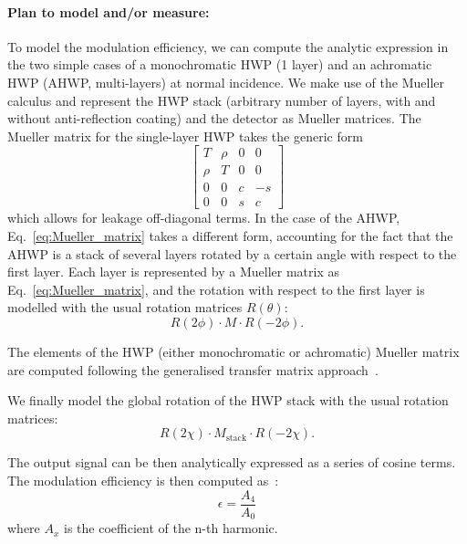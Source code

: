 \paragraph{Plan to model and/or measure:}
To model the modulation efficiency, we can compute the analytic expression in the two simple cases of a monochromatic HWP (1 layer) and an achromatic HWP (AHWP, multi-layers) at normal incidence. We make use of the Mueller calculus and represent the HWP stack (arbitrary number of layers, with and without anti-reflection coating) and the detector as Mueller matrices. The Mueller matrix for the single-layer HWP takes the generic form 
\begin{equation} 
\begin{bmatrix}
   T  &\rho  &0  &0\\
   \rho  &T  &0  &0\\
   0  &0  &c  &-s\\
   0  &0  &s  &c
\end{bmatrix}
\end{equation}\label{eq:Mueller_Matrix}
which allows for leakage off-diagonal terms. In the case of the AHWP, Eq.~\ref{eq:Mueller_matrix} takes a different form, accounting for the fact that the AHWP is a stack of several layers rotated by a certain angle with respect to the first layer. Each layer is represented by a Mueller matrix as Eq.~\ref{eq:Mueller_matrix}, and the rotation with respect to the first layer is modelled with the usual rotation matrices $R(\theta)$:
\begin{equation}
R{(2\phi)}\cdot M \cdot R(-2\phi).
\end{equation} 

The elements of the HWP (either monochromatic or achromatic) Mueller matrix are computed following the generalised transfer matrix approach~\cite{Essinger-Hileman_TM}. 

We finally model the global rotation of the HWP stack with the usual rotation matrices:
\begin{equation}
R{(2\chi)}\cdot M_\mathrm{stack} \cdot R(-2\chi).
\end{equation}

The output signal can be then analytically expressed as a series of cosine terms. The modulation efficiency is then computed as~\cite{Hanany:2005vx,Matsumura:2008zx}:
\begin{equation}\label{eq:eff}
\epsilon=\frac{A_4}{A_0}
\end{equation}
where $A_x$ is the coefficient of the n-th harmonic.


